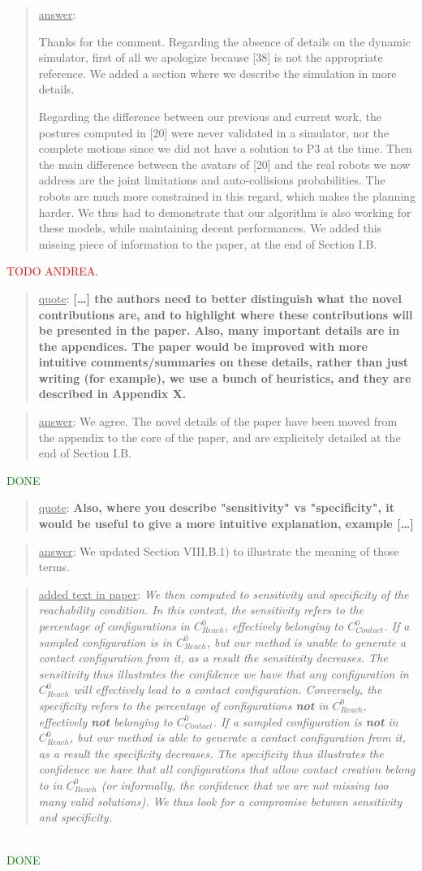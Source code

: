 \documentclass[a4paper]{article}
\newcommand{\gls}[1]{\textit{#1}}
\newcommand{\done}[0]{\textcolor{green}{DONE}}
\newcommand\quot[1]{\begin{quote} \underline{quote}: \textbf{#1}\end{quote}}
\newcommand\as[1]{\begin{quote} \underline{answer}: {#1}\end{quote} }
\newcommand\qt[1]{\begin{quote} \underline{added text in paper}: \textit{#1}\end{quote} \leavevmode \\ }
\begin{document}
\as{Thanks for the comment. Regarding the absence of details on the dynamic simulator, first of all we apologize because [38] is not the appropriate reference.
We added a section where we describe the simulation in more details. 

Regarding the difference between our previous and current work, the postures computed in [20] were never validated in a simulator, nor the complete motions since 
we did not have a solution to P3 at the time. Then the main
difference between the avatars of [20] and the real robots we now address are the joint limitations and auto-collisions probabilities.
The robots are much more constrained in this regard, which makes the planning harder. We thus had to demonstrate that our algorithm is also working
for these models, while maintaining decent performances.
We added this missing piece of information to the paper, at the end of Section I.B.}
\textcolor{red}{TODO ANDREA}.


\quot{[\dots] the authors need to better
distinguish what the novel contributions are, and to highlight where
these contributions will be presented in the paper.  Also, many
important details are in the appendices. The paper would be improved
with more intuitive comments/summaries on these details, rather than
just writing (for example), we use a bunch of heuristics, and they are
described in Appendix X.}

\as{We agree. The novel details of the paper have been moved from the appendix to the core of the paper, and are explicitely detailed at the end of Section I.B.} \done

\quot{
Also, where you describe "sensitivity" vs "specificity", it would be
useful to give a more intuitive explanation, example [\dots]}

\as{We updated Section VIII.B.1) to illustrate the meaning of those terms.}
\qt{We then computed to sensitivity and specificity of the reachability condition.  In this context, the sensitivity refers to the percentage of configurations in $C_{Reach}^0$, effectively belonging to \gls{$C_{Contact}^0$}. If a sampled configuration is in $C_{Reach}^0$, but our method is unable to generate a contact configuration from it, as a result the sensitivity
decreases. The sensitivity thus illustrates the confidence we have that any configuration in $C_{Reach}^0$ will effectively lead to a contact configuration.
Conversely, the specificity refers to the percentage of configurations \textbf{not} in $C_{Reach}^0$, effectively \textbf{not} belonging to \gls{$C_{Contact}^0$}.
If a sampled configuration is \textbf{not} in $C_{Reach}^0$, but our method is able to generate a contact configuration from it, as a result the specificity
decreases. The specificity thus illustrates the confidence we have that all configurations that allow contact creation belong to in $C_{Reach}^0$ (or informally, the confidence that we are not missing too many valid solutions).
We thus look for a compromise between sensitivity and specificity.} \done
\end{document}

